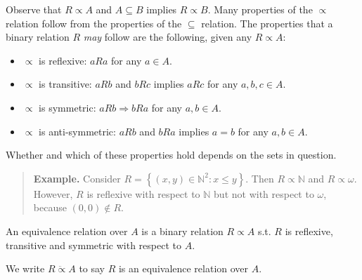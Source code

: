 \documentclass[a4paper, 12pt]{article}
\begin{document}
Observe that $R \propto A$ and $A \subseteq B$ implies $R \propto B$. Many
properties of the $\propto $ relation follow from the properties of the $\subseteq $
relation. The properties that a binary relation $R$ \textit{may} follow are the
following, given any $R \propto A$:

\begin{itemize}
    \item $\propto $ is reflexive: $aRa$ for any $a \in A$.
    \item $\propto $ is transitive: $aRb$ and $bRc$ implies $aRc$ for any $a, b,
        c \in A$.
    \item $\propto $ is symmetric: $aRb \Rightarrow bRa$ for any $a, b \in A$.
    \item $\propto $ is anti-symmetric: $aRb$ and $bRa$ implies $a = b$ for any
        $a, b \in A$.
\end{itemize}

Whether and which of these properties hold depends on the sets in question. 


\small
\begin{quote}

\textbf{Example.} Consider $R = \left\{ (x, y) \in  \mathbb{N}^2 : x \leq y
\right\} $. Then $R \propto \mathbb{N}$ and $R \propto \omega$. However, $R$ is
reflexive with respect to $\mathbb{N}$ but not with respect to $\omega$, because
$(0, 0) \not\in R$.

\end{quote}
\normalsize

\begin{definition}
    An equivalence relation over $A$ is a binary relation $R \propto A$ s.t. $R$
    is reflexive, transitive and symmetric with respect to $A$.
\end{definition}

We write $R \ddot{\propto} A$ to say $R$ is an equivalence relation over $A$.
\end{document}
